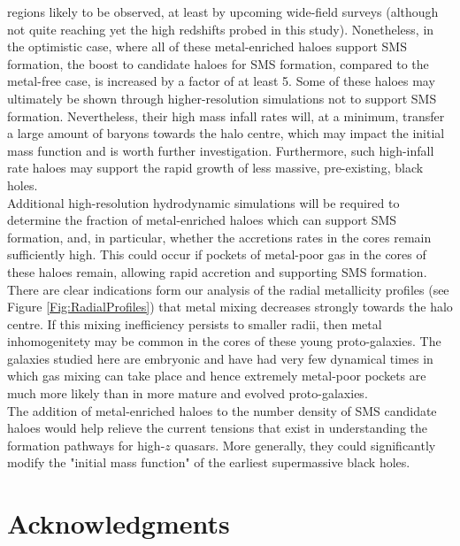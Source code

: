 \documentclass[graphics, twocolumn, usenatbib]{mn2e}
\begin{document}
regions likely to be observed, at least by upcoming wide-field surveys (although not quite reaching yet the high
redshifts probed in this study). Nonetheless, 
in the optimistic case, where all of these metal-enriched haloes support SMS formation, the boost to
candidate haloes for SMS formation, compared to the metal-free case, is increased by a factor of at least 5. Some of these haloes may ultimately be shown through higher-resolution simulations not to support SMS formation. Nevertheless, their high mass infall rates will, at a minimum, transfer a large amount of 
baryons towards the halo centre, which may impact the initial mass function and is worth
further investigation. Furthermore, such high-infall rate haloes may support the rapid growth of less massive, pre-existing,
black holes. \\
\indent Additional high-resolution hydrodynamic simulations will be required to
determine the fraction of metal-enriched haloes which can support SMS formation, and, in particular, whether the accretions rates in the cores remain sufficiently high.  This could occur if pockets of metal-poor gas in the cores of these haloes remain, allowing rapid accretion and supporting SMS formation. There are clear
indications form our analysis of the radial metallicity profiles (see Figure \ref{Fig:RadialProfiles}) that
metal mixing decreases strongly towards the halo centre. If this mixing inefficiency persists to smaller radii,
then metal inhomogenitety may be common in the cores of these young proto-galaxies. The galaxies studied here are
embryonic and have had very few dynamical times in which 
gas mixing can take place and hence extremely metal-poor pockets are much more likely than in more mature and evolved proto-galaxies.\\
\indent  The addition of metal-enriched haloes to the number density of SMS
candidate haloes would help relieve the current tensions that exist in understanding the formation pathways for high-$z$ quasars. More generally, they could significantly modify the "initial mass function" of the earliest supermassive black holes.

\section*{Acknowledgments}
\end{document}
